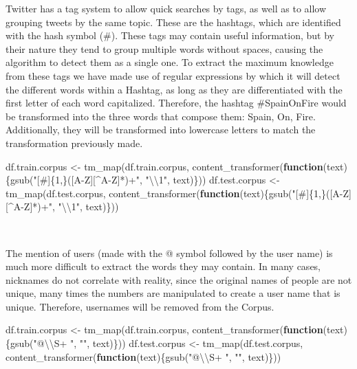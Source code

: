 \documentclass[
]{article}
\newenvironment{Shaded}{\begin{snugshade}}{\end{snugshade}}
\newcommand{\ControlFlowTok}[1]{\textcolor[rgb]{0.13,0.29,0.53}{\textbf{#1}}}
\newcommand{\FunctionTok}[1]{\textcolor[rgb]{0.00,0.00,0.00}{#1}}
\newcommand{\NormalTok}[1]{#1}
\newcommand{\OtherTok}[1]{\textcolor[rgb]{0.56,0.35,0.01}{#1}}
\newcommand{\SpecialCharTok}[1]{\textcolor[rgb]{0.00,0.00,0.00}{#1}}
\newcommand{\StringTok}[1]{\textcolor[rgb]{0.31,0.60,0.02}{#1}}
\begin{document}
Twitter has a tag system to allow quick searches by tags, as well as to
allow grouping tweets by the same topic. These are the hashtags, which
are identified with the hash symbol (\#). These tags may contain useful
information, but by their nature they tend to group multiple words
without spaces, causing the algorithm to detect them as a single one. To
extract the maximum knowledge from these tags we have made use of
regular expressions by which it will detect the different words within a
Hashtag, as long as they are differentiated with the first letter of
each word capitalized. Therefore, the hashtag \#SpainOnFire would be
transformed into the three words that compose them: Spain, On, Fire.
Additionally, they will be transformed into lowercase letters to match
the transformation previously made.

\begin{Shaded}
\begin{Highlighting}[]
\NormalTok{df.train.corpus }\OtherTok{\textless{}{-}} \FunctionTok{tm\_map}\NormalTok{(df.train.corpus, }\FunctionTok{content\_transformer}\NormalTok{(}\ControlFlowTok{function}\NormalTok{(text)\{}\FunctionTok{gsub}\NormalTok{(}\StringTok{"[\#]\{1,\}([A{-}Z][\^{}A{-}Z]*)+"}\NormalTok{, }\StringTok{"}\SpecialCharTok{\textbackslash{}\textbackslash{}}\StringTok{1"}\NormalTok{, text)\}))}
\NormalTok{df.test.corpus }\OtherTok{\textless{}{-}} \FunctionTok{tm\_map}\NormalTok{(df.test.corpus, }\FunctionTok{content\_transformer}\NormalTok{(}\ControlFlowTok{function}\NormalTok{(text)\{}\FunctionTok{gsub}\NormalTok{(}\StringTok{"[\#]\{1,\}([A{-}Z][\^{}A{-}Z]*)+"}\NormalTok{, }\StringTok{"}\SpecialCharTok{\textbackslash{}\textbackslash{}}\StringTok{1"}\NormalTok{, text)\}))}
\end{Highlighting}
\end{Shaded}

~

The mention of users (made with the @ symbol followed by the user name)
is much more difficult to extract the words they may contain. In many
cases, nicknames do not correlate with reality, since the original names
of people are not unique, many times the numbers are manipulated to
create a user name that is unique. Therefore, usernames will be removed
from the Corpus.

\begin{Shaded}
\begin{Highlighting}[]
\NormalTok{df.train.corpus }\OtherTok{\textless{}{-}} \FunctionTok{tm\_map}\NormalTok{(df.train.corpus, }\FunctionTok{content\_transformer}\NormalTok{(}\ControlFlowTok{function}\NormalTok{(text)\{}\FunctionTok{gsub}\NormalTok{(}\StringTok{"@}\SpecialCharTok{\textbackslash{}\textbackslash{}}\StringTok{S+ "}\NormalTok{, }\StringTok{""}\NormalTok{, text)\}))}
\NormalTok{df.test.corpus }\OtherTok{\textless{}{-}} \FunctionTok{tm\_map}\NormalTok{(df.test.corpus, }\FunctionTok{content\_transformer}\NormalTok{(}\ControlFlowTok{function}\NormalTok{(text)\{}\FunctionTok{gsub}\NormalTok{(}\StringTok{"@}\SpecialCharTok{\textbackslash{}\textbackslash{}}\StringTok{S+ "}\NormalTok{, }\StringTok{""}\NormalTok{, text)\}))}
\end{Highlighting}
\end{Shaded}
\end{document}
